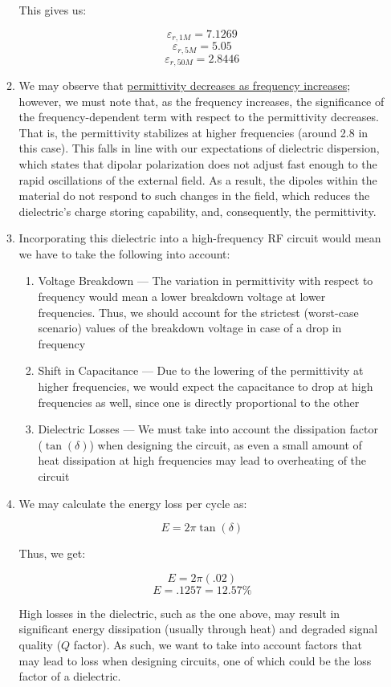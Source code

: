 \begin{enumerate}
\begin{enumerate}
        This gives us:

        $$\boxed{\varepsilon_{r,1M}=7.1269}$$
        $$\boxed{\varepsilon_{r,5M}=5.05}$$
        $$\boxed{\varepsilon_{r,50M}=2.8446}$$

      \item We may observe that \underline{permittivity decreases as frequency increases}; however, we must note that, as the frequency increases, the significance of the frequency-dependent term with respect to the permittivity decreases. That is, the permittivity stabilizes at higher frequencies (around 2.8 in this case). This falls in line with our expectations of dielectric dispersion, which states that dipolar polarization does not adjust fast enough to the rapid oscillations of the external field. As a result, the dipoles within the material do not respond to such changes in the field, which reduces the dielectric's charge storing capability, and, consequently, the permittivity.

      \item Incorporating this dielectric into a high-frequency RF circuit would mean we have to take the following into account:

        \begin{enumerate}

          \item Voltage Breakdown — The variation in permittivity with respect to frequency would mean a lower breakdown voltage at lower frequencies. Thus, we should account for the strictest (worst-case scenario) values of the breakdown voltage in case of a drop in frequency

          \item Shift in Capacitance — Due to the lowering of the permittivity at higher frequencies, we would expect the capacitance to drop at high frequencies as well, since one is directly proportional to the other

          \item Dielectric Losses — We must take into account the dissipation factor ($\tan(\delta)$) when designing the circuit, as even a small amount of heat dissipation at high frequencies may lead to overheating of the circuit

        \end{enumerate}

      \item We may calculate the energy loss per cycle as:

        $$E=2\pi \tan(\delta)$$

        Thus, we get:

        $$E=2\pi(.02)$$
        $$\boxed{E=.1257=12.57\%}$$

        High losses in the dielectric, such as the one above, may result in significant energy dissipation (usually through heat) and degraded signal quality ($Q$ factor). As such, we want to take into account factors that may lead to loss when designing circuits, one of which could be the loss factor of a dielectric.

    \end{enumerate}

\end{enumerate}



